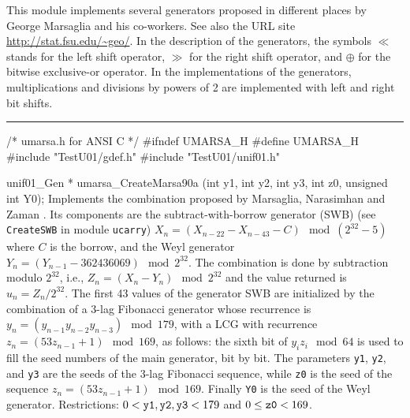 
This module implements several generators proposed in different places
by George Marsaglia and his  co-workers.
See also the URL site \url{http://stat.fsu.edu/~geo/}.
In the description of the generators, the symbols $\ll$ stands for
 the left shift operator, $\gg$ for the right shift operator,
 and  $\oplus$ for the bitwise exclusive-or operator. In the
implementations of the generators, multiplications and divisions by powers
of 2 are implemented with left and right bit shifts.

\def\OP{\mathop {S}\nolimits}

\bigskip
\hrule
\code\hide
/* umarsa.h for ANSI C */
#ifndef UMARSA_H
#define UMARSA_H
\endhide
#include "TestU01/gdef.h"
#include "TestU01/unif01.h"


unif01_Gen * umarsa_CreateMarsa90a (int y1, int y2, int y3, int z0,
                                    unsigned int Y0);
\endcode
  \tab Implements the combination proposed by Marsaglia, Narasimhan and
   Zaman \cite{rMAR90a}. Its components are the subtract-with-borrow
%
   generator (SWB) (see {\tt CreateSWB} in module {\tt ucarry})
   $X_n = (X_{n-22} - X_{n-43} - C) \mod (2^{32}-5)$
   where $C$ is the borrow, and the Weyl generator
   $Y_n = (Y_{n-1} - 362436069) \mod 2^{32}$.
   The combination is done by subtraction modulo $2^{32}$, i.e.,
   $Z_n = (X_n - Y_n) \mod 2^{32}$ and the value returned is
   $u_n = Z_n/2^{32}$.
   The first 43 values of the generator SWB are initialized by the
   combination of a 3-lag Fibonacci generator whose recurrence is 
   $y_n = (y_{n-1}y_{n-2}y_{n-3}) \mod 179$, with a LCG with recurrence 
   $z_n = (53z_{n-1} + 1) \mod 169$, as
   follows: the sixth bit of $y_i z_i \mod 64$ is used to fill the seed
   numbers of the main generator, bit by bit.
   The parameters {\tt y1}, {\tt y2},  and {\tt y3} are the seeds of the
    3-lag Fibonacci sequence, while {\tt z0} is the seed of the
   sequence $z_{n} = (53 z_{n-1} + 1)\mod 169$.  Finally {\tt Y0}
   is the seed of the  Weyl generator.  Restrictions: $0 < {\tt y1}, 
   {\tt y2}, {\tt y3} < 179$ and $0 \le {\tt z0} < 169$.
  \endtab
\code


